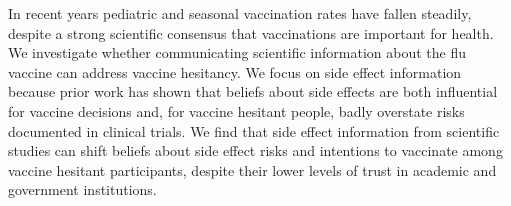 

\noindent 
In recent years pediatric and seasonal vaccination rates have fallen steadily, despite a strong scientific consensus that vaccinations are important for health. 
We investigate whether communicating scientific information about the flu vaccine can address vaccine hesitancy. 
We focus on side effect information because prior work has shown that beliefs about side effects are both influential for vaccine decisions and, 
for vaccine hesitant people, badly overstate risks documented in clinical trials. We find that side effect information from scientific studies can shift beliefs about side effect risks and intentions to 
vaccinate among vaccine hesitant participants, despite their lower levels of trust in academic and government institutions.
